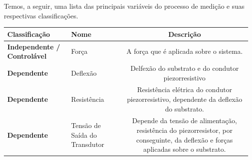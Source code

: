 \documentclass{article}
\begin{document}
    Temos, a seguir, uma lista das principais variáveis do processo de medição e suas respectivas classificações.

    \begin{table}[h]
        \centering
        \begin{tabular}{|l|l|c|}
            \hline
            Classificação & Nome & Descrição   \\ \hline

            \textbf{Independente / Controlável} & Força & 
            \begin{minipage}{.4\textwidth}
                \vspace{5px}
                A força que é aplicada sobre o sistema.
                \vspace{5px}
            \end{minipage} \\ \hline
            
             \textbf{Dependente} &
             Deflexão & 
             \begin{minipage}{.40\textwidth} \vspace{5px}
                 Delfexão do substrato e do condutor piezorresistivo 
                 \vspace{5px}
             \end{minipage}\\ \hline

             \textbf{Dependente} & Resistência & 

             \begin{minipage}{.4\textwidth}\vspace{5px}
                 Resistência elétrica do condutor piezorresistivo, dependente da deflexão do substrato.
                 \vspace{5px}
             \end{minipage}\\ \hline
             
            \textbf{Dependente} & Tensão de Saída do Transdutor & 
            \begin{minipage}{.4\textwidth}\vspace{5px}
                Depende da tensão de alimentação, resistência do piezorresistor, por conseguinte, da deflexão e forças aplicadas sobre o substrato.
                \vspace{5px}
            \end{minipage}\\ \hline
            

\end{tabular}
\end{table}
\end{document}
